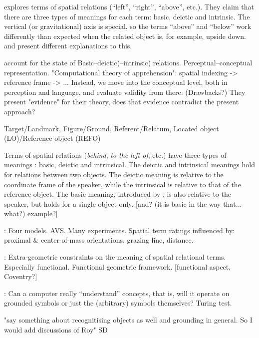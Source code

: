 \cite{Garnhamunifiedtheorymeaning1989} explores terms of spatial relations (``left'', ``right'', ``above'', etc.).
They claim that there are three types of meanings for each term: basic, deictic and intrinsic.
The vertical (or gravitational) axis is special, so the terms ``above'' and ``below'' work differently than expected when the related object is, for example, upside down.
\cite{Leveltperceptuallimitationstalking1984} and \citeauthor{Garnhamunifiedtheorymeaning1989} present different explanations to this.

\cite{LoganComputationalAnalysisApprehension1996} account for the state of 
Basic–deictic(–intrinsic) relations.
Perceptual–conceptual representation.
"Computational theory of apprehension": spatial indexing -> reference frame -> ... Instead, we move into the conceptual level, both in perception and language, and evaluate validity from there.
(Drawbacks?)
They present "evidence" for their theory, does that evidence contradict the present approach?

Target/Landmark, Figure/Ground, Referent/Relatum, Located object (LO)/Reference object (REFO)

Terms of spatial relations (\textit{behind}, \textit{to the left of}, etc.) have three types of meanings \citep{Garnhamunifiedtheorymeaning1989}: basic, deictic and intrinsical.
The deictic and intrinsical meanings hold for relations between two objects.
The deictic meaning is relative to the coordinate frame of the speaker, while the intrinsical is relative to that of the reference object.
The basic meaning, introduced by \cite{Garnhamunifiedtheorymeaning1989}, is also relative to the speaker, but holds for a single object only.
[and? (it is basic in the way that... what?) example?]

\cite{RegierGroundingspatiallanguage2001a}:
Four models. AVS.
Many experiments.
Spatial term ratings influenced by: proximal \& center-of-mass orientations, grazing line, distance.

\cite{CoventryClassificationExtrageometricInfluences2004}:
Extra-geometric constraints on the meaning of spatial relational terms.
Especially functional.
Functional geometric framework.
[functional aspect, Coventry?]

\cite{HarnadSymbolGroundingProblem1990}:
Can a computer really ``understand'' concepts, that is, will it operate on grounded symbols or just the (arbitrary) symbols themselves?
Turing test.

"say something about recognitising objects as well and grounding in general. So I would add discussions of Roy" SD



